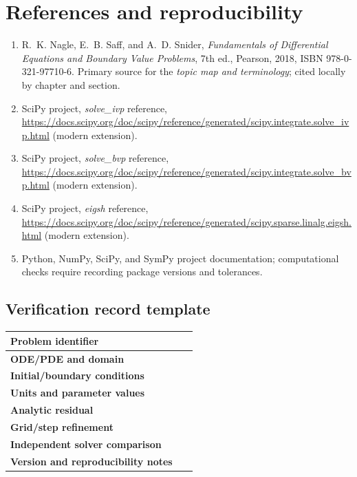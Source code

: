 \documentclass[11pt,letterpaper,oneside]{report}
\theoremstyle{definition}\newtheorem{definition}[theorem]{Definition}
\theoremstyle{remark}\newtheorem{remark}[theorem]{Remark}
\begin{document}
\chapter{References and reproducibility}
\begin{enumerate}
\item R.~K. Nagle, E.~B. Saff, and A.~D. Snider, \emph{Fundamentals of Differential Equations and Boundary Value Problems}, 7th ed., Pearson, 2018, ISBN 978-0-321-97710-6. Primary source for the \emph{topic map and terminology}; cited locally by chapter and section.
\item SciPy project, \emph{solve\_ivp} reference, \url{https://docs.scipy.org/doc/scipy/reference/generated/scipy.integrate.solve_ivp.html} (modern extension).
\item SciPy project, \emph{solve\_bvp} reference, \url{https://docs.scipy.org/doc/scipy/reference/generated/scipy.integrate.solve_bvp.html} (modern extension).
\item SciPy project, \emph{eigsh} reference, \url{https://docs.scipy.org/doc/scipy/reference/generated/scipy.sparse.linalg.eigsh.html} (modern extension).
\item Python, NumPy, SciPy, and SymPy project documentation; computational checks require recording package versions and tolerances.
\end{enumerate}
\section*{Verification record template}
\begin{tabularx}{\textwidth}{>{\bfseries}p{}X}\toprule
Problem identifier & \rule{0pt}{15pt}\ \\ \midrule
ODE/PDE and domain & \\[8pt]
Initial/boundary conditions & \\[8pt]
Units and parameter values & \\[8pt]
Analytic residual & \\ [8pt]
Grid/step refinement & \\ [8pt]
Independent solver comparison & \\ [8pt]
Version and reproducibility notes & \\ [8pt]\bottomrule
\end{tabularx}
\end{document}
